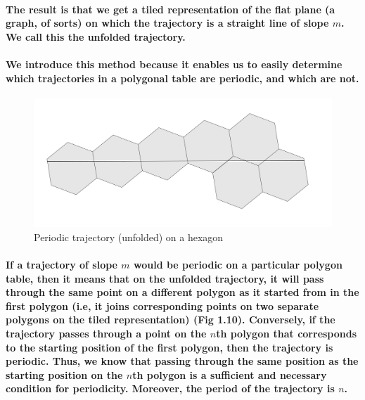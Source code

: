 \documentclass{report}
\begin{document}
\paragraph{The result is that we get a tiled representation of the flat plane (a graph, of sorts) on which the trajectory is a straight line of slope $m$. We call this the unfolded trajectory.}



\paragraph{We introduce this method because it enables us to easily determine which trajectories in a polygonal table are periodic, and which are not.}

\begin{figure} 
\begin{center}
\includegraphics[scale=0.3]{10}
\caption{Periodic trajectory (unfolded) on a hexagon}
\end{center}
\end{figure}

\paragraph{If a trajectory of slope $m$ would be periodic on a particular polygon table, then it means that on the unfolded trajectory, it will pass through the same point on a different polygon as it started from in the first polygon (i.e, it joins corresponding points on two separate polygons on the tiled representation) (Fig 1.10). Conversely, if the trajectory passes through a point on the $n$th polygon that corresponds to the starting position of the first polygon, then the trajectory is periodic. Thus, we know that passing through the same position as the starting position on the $n$th polygon is a sufficient and necessary condition for periodicity. Moreover, the period of the trajectory is $n$.}
\end{document}
